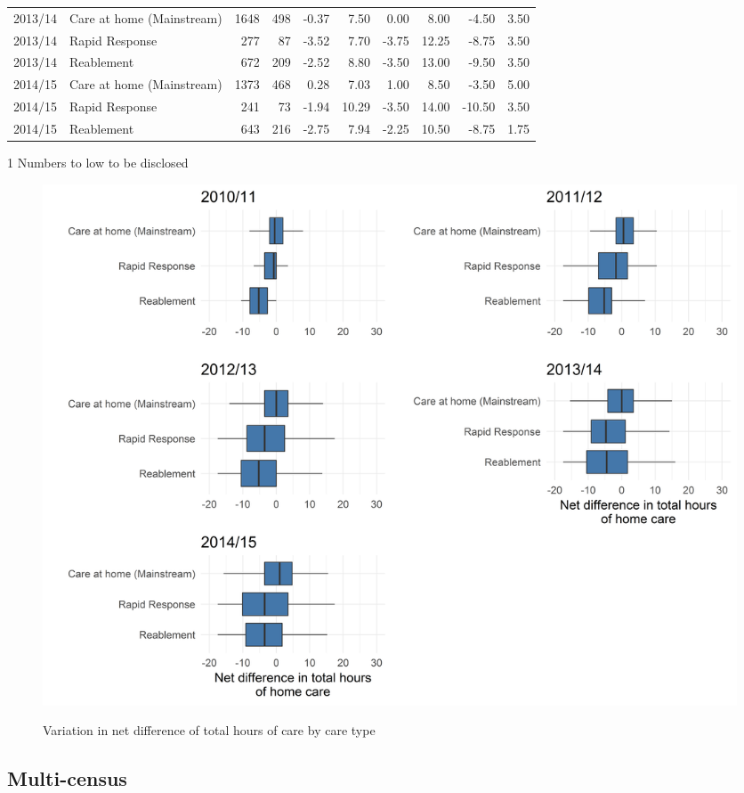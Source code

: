 \documentclass[]{article}
\begin{document}
\begin{table}[]
{\begin{threeparttable}
\begin{tabular}{@{}llrrrrrrrr@{}}
2013/14 & Care at home (Mainstream) & 1648 & 498 & -0.37 & 7.50 & 0.00 & 8.00 & -4.50 & 3.50 \\
2013/14 & Rapid Response & 277 & 87 & -3.52 & 7.70 & -3.75 & 12.25 & -8.75 & 3.50 \\
2013/14 & Reablement & 672 & 209 & -2.52 & 8.80 & -3.50 & 13.00 & -9.50 & 3.50 \\
2014/15 & Care at home (Mainstream) & 1373 & 468 & 0.28 & 7.03 & 1.00 & 8.50 & -3.50 & 5.00 \\
2014/15 & Rapid Response & 241 & 73 & -1.94 & 10.29 & -3.50 & 14.00 & -10.50 & 3.50 \\
2014/15 & Reablement & 643 & 216 & -2.75 & 7.94 & -2.25 & 10.50 & -8.75 & 1.75 \\ \bottomrule
\end{tabular}
\begin{tablenotes}
\item[1] Numbers to low to be disclosed
\end{tablenotes}
\end{threeparttable}%
}
\end{table}

\begin{figure}[]
  \centering
    \caption{Variation in net difference of total hours of care by care type}
    \includegraphics[]{figures/chapter-renf/10-net-diff-plot.png}
    \label{fig:renf-net-diff}
\end{figure}

\FloatBarrier
\subsection{Multi-census}\label{subsec:renf-multi-census}
\end{document}
